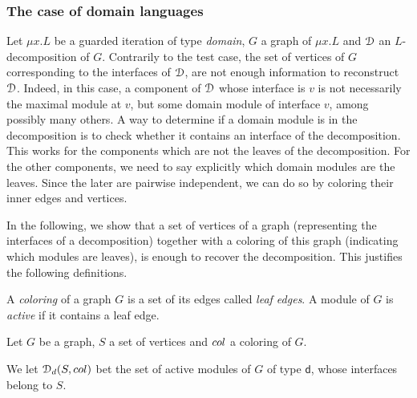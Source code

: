 \subsubsection{The case of domain  languages}
Let $\mu x. L$ be a guarded iteration of type \emph{domain}, $G$ a graph of $\mu x. L$ and $\mathcal D$ an $L$-decomposition of $G$. Contrarily to the test case, the set of vertices  of $G$ corresponding to the interfaces of $\mathcal D$, are not enough information to reconstruct $\mathcal D$. Indeed, in this case,  a component of $\mathcal D$ whose interface is $v$ is not necessarily the maximal module at $v$, but some domain module of interface $v$, among possibly many others. 
A way to determine if a domain module is in the decomposition is to check whether it contains an interface of the decomposition. This works for the components which are not the leaves of the decomposition. For the other components, we need to say explicitly which domain modules are the leaves. Since the later are pairwise independent, we can do so by coloring their inner edges and vertices. 



In the following, we show that a set of vertices of a graph (representing the interfaces of a decomposition) together with a coloring of this graph (indicating which modules are leaves), is enough to recover the decomposition. This justifies the following definitions.
 
\begin{definition}
A \emph{coloring} of a graph $G$ is a set of its edges called \emph{leaf edges}. A module of $G$ is \emph{active} if it contains a leaf edge.

%
\end{definition}

\begin{definition} Let $G$ be a graph, $S$ a set of vertices and $\col$ a coloring of $G$.   

 \noindent We let $\cD_\mathsf{d}(S, \col)$ bet the set of active modules of $G$ of type $\mathsf{d}$, whose interfaces belong to $S$. 
\end{definition}


